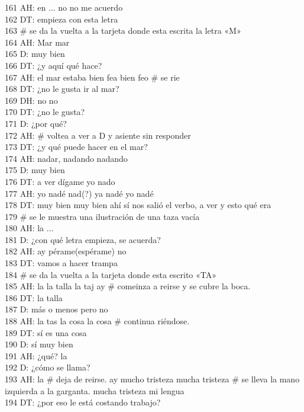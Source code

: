 161 AH: en ... no no me acuerdo\\
162 DT: empieza con esta letra\\
163 # se da la vuelta a la tarjeta donde esta escrita la letra «M»\\
164 AH: Mar mar\\
165 D: muy bien\\
166 DT: ¿y aquí qué hace?\\
167 AH: el mar estaba bien fea bien feo # se rie\\
168 DT: ¿no le gusta ir al mar?\\
169 DH: no no\\
170 DT: ¿no le gusta?\\
171 D: ¿por qué?\\
172 AH: # voltea a ver a D y asiente sin responder\\
173 DT: ¿y qué puede hacer en el mar?\\
174 AH: nadar, nadando nadando\\
175 D: muy bien\\
176 DT: a ver dígame yo nado\\
177 AH: yo nadé nad(?) ya nadé yo nadé\\
178 DT: muy bien muy bien ahí sí nos salió el verbo, a ver y esto qué era\\
179 # se le muestra una ilustración de una taza vacía\\
180 AH: la ...\\
181 D: ¿con qué letra empieza, se acuerda?\\
182 AH: ay pérame(espérame) no\\
183 DT: vamos a hacer trampa\\
184 # se da la vuelta a la tarjeta donde esta escrito «TA»\\
185 AH: la la talla la taj ay # comeinza a reirse y se cubre la boca.\\
186 DT: la talla\\
187 D: más o menos pero no\\
188 AH: la tas la cosa la cosa # continua riéndose.\\
189 DT: sí es una cosa\\
190 D: sí muy bien\\
191 AH: ¿qué? la\\
192 D: ¿cómo se llama?\\
193 AH: la # deja de reirse. ay mucho tristeza mucha tristeza # se lleva la mano izquierda a la garganta. mucha tristeza mi lengua\\
194 DT: ¿por eso le está costando trabajo?\\
